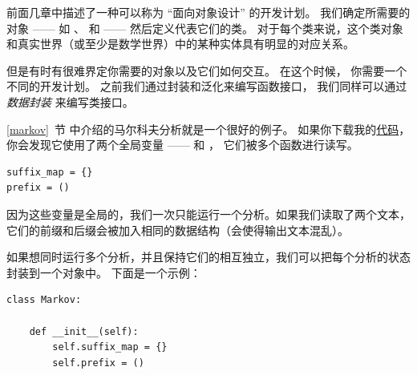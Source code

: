前面几章中描述了一种可以称为 ``面向对象设计'' 的开发计划。  
我们确定所需要的对象 —— 如 、  和  —— 然后定义代表它们的类。
对于每个类来说，这个类对象和真实世界（或至少是数学世界）中的某种实体具有明显的对应关系。



但是有时有很难界定你需要的对象以及它们如何交互。  
在这个时候， 你需要一个不同的开发计划。  
之前我们通过封装和泛化来编写函数接口， 我们同样可以通过 {\em 数据封装} 来编写类接口。



\ref{markov}~节 中介绍的马尔科夫分析就是一个很好的例子。  
如果你下载我的\href{http://thinkpython2.com/code/markov.py}{代码}， 你会发现它使用了两个全局变量 ——  和 ， 它们被多个函数进行读写。

\begin{lstlisting}
suffix_map = {}
prefix = ()
\end{lstlisting}


因为这些变量是全局的，我们一次只能运行一个分析。如果我们读取了两个文本，
它们的前缀和后缀会被加入相同的数据结构（会使得输出文本混乱）。


如果想同时运行多个分析，并且保持它们的相互独立，我们可以把每个分析的状态封装到一个对象中。
下面是一个示例：

\begin{lstlisting}
class Markov:

    def __init__(self):
        self.suffix_map = {}
        self.prefix = ()
\end{lstlisting}

